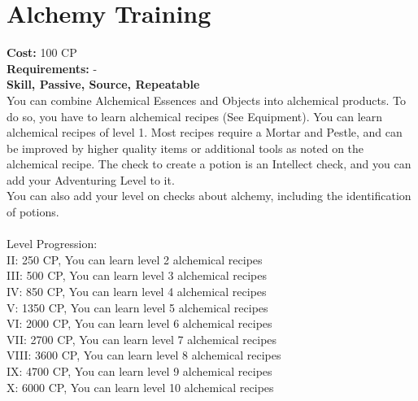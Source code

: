 \section{Alchemy Training}
\textbf{Cost:} 100 CP\\
\textbf{Requirements:} -\\
\textbf{Skill, Passive, Source, Repeatable}\\
You can combine Alchemical Essences and Objects into alchemical products. To do so, you have to learn alchemical recipes (See Equipment). You can learn alchemical recipes of level 1. Most recipes require a Mortar and Pestle, and can be improved by higher quality items or additional tools as noted on the alchemical recipe. The check to create a potion is an Intellect check, and you can add your Adventuring Level to it.\\
You can also add your level on checks about alchemy, including the identification of potions.\\
\\
Level Progression:\\
II: 250 CP, You can learn level 2 alchemical recipes\\
III: 500 CP, You can learn level 3 alchemical recipes\\
IV: 850 CP, You can learn level 4 alchemical recipes\\
V: 1350 CP, You can learn level 5 alchemical recipes\\
VI: 2000 CP, You can learn level 6 alchemical recipes\\
VII: 2700 CP, You can learn level 7 alchemical recipes\\
VIII: 3600 CP, You can learn level 8 alchemical recipes\\
IX: 4700 CP, You can learn level 9 alchemical recipes\\
X: 6000 CP, You can learn level 10 alchemical recipes\\